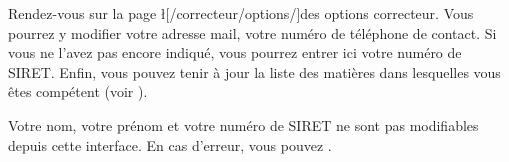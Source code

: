 ﻿Rendez-vous sur la page \l[/correcteur/options/]{des options correcteur}.
Vous pourrez y modifier votre adresse mail, votre numéro de téléphone de contact.
Si vous ne l'avez pas encore indiqué, vous pourrez entrer ici votre numéro de SIRET.
Enfin, vous pouvez tenir à jour la liste des matières dans lesquelles vous êtes compétent (voir ).

Votre nom, votre prénom et votre numéro de SIRET ne sont pas modifiables depuis cette interface. En cas d'erreur, vous pouvez .